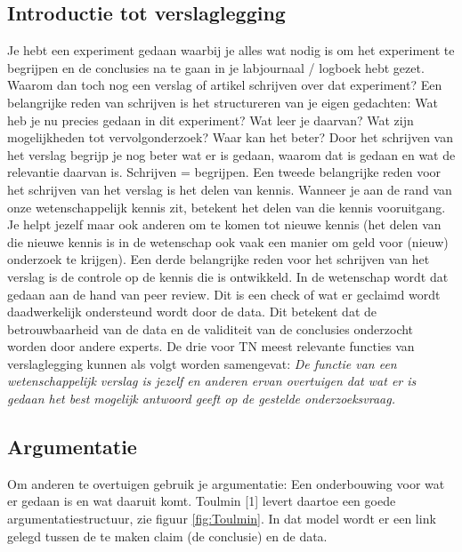 \subsection{Introductie tot verslaglegging}
Je hebt een experiment gedaan waarbij je alles wat nodig is om het experiment te begrijpen en de conclusies na te gaan in je labjournaal / logboek hebt gezet. Waarom dan toch nog een verslag of artikel schrijven over dat experiment? 
Een belangrijke reden van schrijven is het structureren van je eigen gedachten: Wat heb je nu precies gedaan in dit experiment? Wat leer je daarvan? Wat zijn mogelijkheden tot vervolgonderzoek? Waar kan het beter? Door het schrijven van het verslag begrijp je nog beter wat er is gedaan, waarom dat is gedaan en wat de relevantie daarvan is. Schrijven = begrijpen.\newline\newline
%
Een tweede belangrijke reden voor het schrijven van het verslag is het delen van kennis. Wanneer je aan de rand van onze wetenschappelijk kennis zit, betekent het delen van die kennis vooruitgang. Je helpt jezelf maar ook anderen om te komen tot nieuwe kennis (het delen van die nieuwe kennis is in de wetenschap ook vaak een manier om geld voor (nieuw) onderzoek te krijgen).\newline\newline 
%
Een derde belangrijke reden voor het schrijven van het verslag is de controle op de kennis die is ontwikkeld. In de wetenschap wordt dat gedaan aan de hand van peer review. Dit is een check of wat er geclaimd wordt daadwerkelijk ondersteund wordt door de data. Dit betekent dat de betrouwbaarheid van de data en de validiteit van de conclusies onderzocht worden door andere experts.\newline\newline 
%
De drie voor TN meest relevante functies van verslaglegging kunnen als volgt worden samengevat: \textit{De functie van een wetenschappelijk verslag is jezelf en anderen ervan overtuigen dat wat er is gedaan het best mogelijk antwoord geeft op de gestelde onderzoeksvraag.} 
%
\subsection{Argumentatie}
Om anderen te overtuigen gebruik je argumentatie: Een onderbouwing voor wat er gedaan is en wat daaruit komt. Toulmin [1] levert daartoe een goede argumentatiestructuur, zie figuur \ref{fig:Toulmin}. In dat model wordt er een link gelegd tussen de te maken claim (de conclusie) en de data. 

